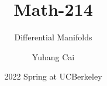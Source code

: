 \documentclass[a4paper, 11pt]{report}
\begin{document}
	\title{Math-214}%
	\subtitle{Differential Manifolds}
	\author{Yuhang Cai}
	\date{2022 Spring at UCBerkeley} %
	





\tableofcontents
\newpage






\end{document}
